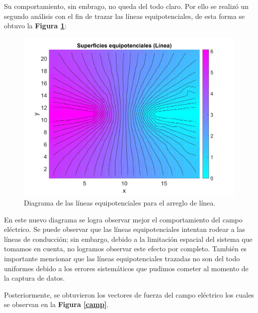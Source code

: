 \documentclass[letterpaper, 11 pt]{article}
\begin{document}
\begin{multicols}{2}
Su comportamiento, sin embrago, no queda del todo claro. Por ello se realizó un segundo análisis con el fin de trazar las líneas equipotenciales, de esta forma se obtuvo la \textbf{Figura \ref{equi}}:

\begin{figure}[H]
    \captionsetup{justification=centering,margin=0.5cm}
    \centering
    \includegraphics[scale=0.05]{equilin.jpg}
    \caption{Diagrama de las líneas equipotenciales para el arreglo de línea.}
    \label{equi}
\end{figure}

En este nuevo diagrama se logra observar mejor el comportamiento del campo eléctrico. Se puede observar que las líneas equipotenciales intentan rodear a las líneas de conducción; sin embargo, debido a la limitación espacial del sistema que tomamos en cuenta, no logramos observar este efecto por completo. También es importante mencionar que las líneas equipotenciales trazadas no son del todo uniformes debido a los errores sistemáticos que pudimos cometer al momento de la captura de datos.

Posteriormente, se obtuvieron los vectores de fuerza del campo eléctrico los cuales se observan en la \textbf{Figura \ref{camp}}.


\end{multicols}
\end{document}
